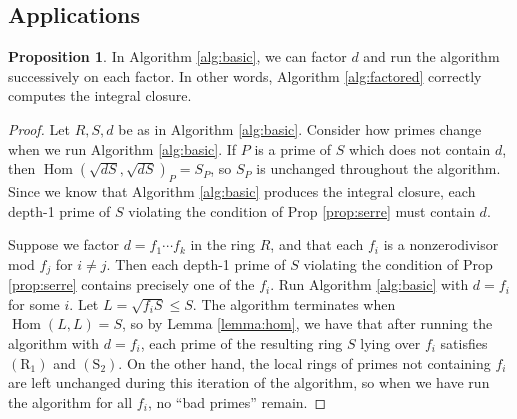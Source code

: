 \documentclass{amsart}
\theoremstyle{definition}
\newtheorem{proposition}[theorem]{Proposition}
\DeclareMathOperator{\Hom}{Hom}
\newcommand{\Rone}{(\text{R}_1)}
\newcommand{\Stwo}{(\text{S}_2)}
\begin{document}
\subsection{Applications}
\begin{proposition}
In Algorithm \ref{alg:basic}, we can factor $d$ and run the algorithm successively on each factor.  In other words, Algorithm \ref{alg:factored} correctly computes the integral closure.
\end{proposition}
\begin{proof}
Let $R, S, d$ be as in Algorithm \ref{alg:basic}.  Consider how primes change when we run Algorithm \ref{alg:basic}.  If $P$ is a prime of $S$ which does not contain $d$, then $\Hom(\sqrt{dS},\sqrt{dS})_P = S_P$, so $S_P$ is unchanged throughout the algorithm.  Since we know that Algorithm \ref{alg:basic} produces the integral closure, each depth-1 prime of $S$ violating the condition of Prop \ref{prop:serre} must contain $d$.

Suppose we factor $d = f_1\cdots f_k$ in the ring $R$, and that each $f_i$ is a nonzerodivisor mod $f_j$ for $i\neq j$.  Then each depth-1 prime of $S$ violating the condition of Prop \ref{prop:serre} contains precisely one of the $f_i$.  Run Algorithm \ref{alg:basic} with $d = f_i$ for some $i$.  Let $L = \sqrt{f_iS} \leq S$.  The algorithm terminates when $\Hom(L,L) = S$, so by Lemma \ref{lemma:hom}, we have that after running the algorithm with $d=f_i$, each prime of the resulting ring $S$ lying over $f_i$ satisfies $\Rone$ and $\Stwo$.  On the other hand, the local rings of primes not containing $f_i$ are left unchanged during this iteration of the algorithm, so when we have run the algorithm for all $f_i$, no ``bad primes'' remain. 
\end{proof}
\end{document}
